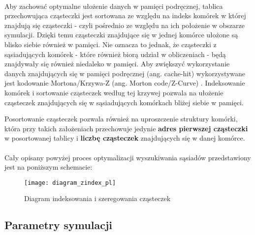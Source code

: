 \paragraph{}
Aby zachować optymalne ułożenie danych w pamięci podręcznej, tablica przechowująca cząsteczki jest sortowana ze względu na indeks komórek w której znajdują się cząsteczki - czyli pośrednio ze względu na ich położenie w obszarze symulacji. Dzięki temu cząsteczki znajdujące się w jednej komórce ułożone są blisko siebie również w pamięci. Nie oznacza to jednak, że cząsteczki z sąsiadujących komórek - które również biorą udział w obliczeniach - będą znajdywały się również niedaleko w pamięci. Aby zwiększyć wykorzystanie danych znajdujących się w pamięci podręcznej (ang. cache-hit) wykorzystywane jest kodowanie Mortona/Krzywa-Z (ang. Morton code/Z-Curve) \cite{wiki:3}. Indeksowanie komórek i sortowanie cząsteczek według tej krzywej pozwala na ułożenie cząsteczek znajdujących się w sąsiadujących komórkach bliżej siebie w pamięci.
\par
Posortowanie cząsteczek pozwala również na uproszczenie struktury komórki, która przy takich założeniach przechowuje jedynie \textbf{adres pierwszej cząsteczki} w posortowanej tablicy i \textbf{liczbę cząsteczek} znajdujących się w danej komórce.
\par

\paragraph{}
Cały opisany powyżej proces optymalizacji wyszukiwania sąsiadów przedstawiony jest na poniższym schemacie:
\par

\begin{figure}[h]
\centering
\caption{Diagram indeksowania i szeregowania cząsteczek}
\texttt{[image: diagram\_zindex\_pl]}
\label{fig:diagram_zindex}
\end{figure}

\subsection{Parametry symulacji}

